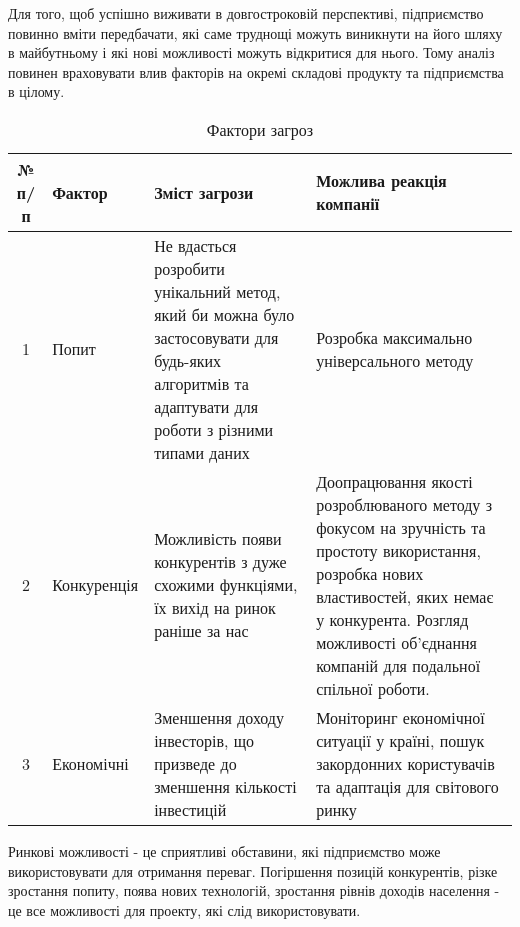 Для того, щоб успішно виживати в довгостроковій перспективі, підприємство повинно вміти передбачати, які саме труднощі можуть виникнути на його шляху в майбутньому і які нові можливості можуть відкритися для нього. Тому аналіз повинен враховувати влив факторів на окремі складові продукту та підприємства в цілому.

\begin{table}[H]
\fontsize{12pt}{12pt}\selectfont
	\begin{tabularx}{\textwidth}{|c|X|X|X|}
    \hline
    № п/п & Фактор & Зміст загрози & Можлива реакція компанії \\ \hline
    1 & Попит & Не вдасться розробити унікальний метод, який би можна було застосовувати для будь-яких алгоритмів та адаптувати для роботи з різними типами даних & Розробка максимально універсального методу \\ \hline 
    2 & Конкуренція & Можливість появи конкурентів з дуже схожими функціями, їх вихід на ринок раніше за нас & Доопрацювання якості розроблюваного методу з фокусом на зручність та простоту використання, розробка нових властивостей, яких немає у конкурента. Розгляд можливості об'єднання компаній для подальної спільної роботи. \\ \hline 
    3 & Економічні & Зменшення доходу інвесторів, що призведе до зменшення кількості інвестицій & Моніторинг економічної ситуації у країні, пошук закордонних користувачів та адаптація для світового ринку \\
    \hline
    \end{tabularx}
\caption{Фактори загроз} \label{tab:stab_3}
\end{table}

Ринкові можливості - це сприятливі обставини, які підприємство може використовувати для отримання переваг. Погіршення позицій конкурентів, різке зростання попиту, поява нових технологій, зростання рівнів доходів населення - це все можливості для проекту, які слід використовувати.

